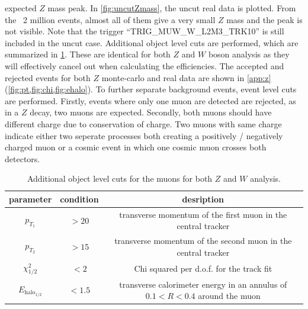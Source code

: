 \documentclass[twoside,        %
               BCOR12mm,       %
               ngerman,english, %
               fleqn,headsepline=false,footsepline=false
              ]{Vorlage/MFPREPORT}
\begin{document}
expected $Z$ mass peak. In \cref{fig:uncutZmass}, the uncut real data is
plotted. From the ~2 million events, almost all of them give a very small $Z$
mass and the peak is not visible. Note that the trigger
``TRIG\_MUW\_W\_L2M3\_TRK10'' \cite{fprakt} is still included in the uncut case.
Additional object level cuts are performed, which are summarized in
\cref{tab:objectcuts}. These are identical for both $Z$ and $W$ boson analysis
as they will effectively cancel out when calculating the efficiencies.
The accepted and rejected events for both $Z$ monte-carlo and real data are
shown in \cref{app:z} (\cref{fig:pt,fig:chi,fig:ehalo}).
To further separate background events, event level cuts are performed. Firstly,
events where only one muon are detected are rejected, as in a $Z$ decay, two
muons are expected. Secondly, both muons should have different charge due to
conservation of charge. Two muons with same charge indicate either two seperate
processes both creating a positively / negatively charged muon or a cosmic
event in which one cosmic muon crosses both detectors.


\begin{table}
    \centering
    \begin{tabular}{|c|c|c|}\hline
        parameter&condition&desription\\\hline
        $p_{T_1}$&$>20$&transverse momentum of the first muon in the central
        tracker\\\hline
        $p_{T_2}$&$>15$&transverse momentum of the second muon in the central
        tracker \\\hline
        $\chi_{1/2}^2$&$<2$&Chi squared per d.o.f. for the track fit\\\hline
        $E_{\text{halo}_{1/2}}$&$< 1.5$&transverse calorimeter energy in an
        annulus of $0.1 < R < 0.4$ around the muon\\\hline
    \end{tabular}
    \caption{Additional object level cuts for the muons for both $Z$ and $W$
    analysis.}
    \label{tab:objectcuts}
\end{table}
\end{document}
